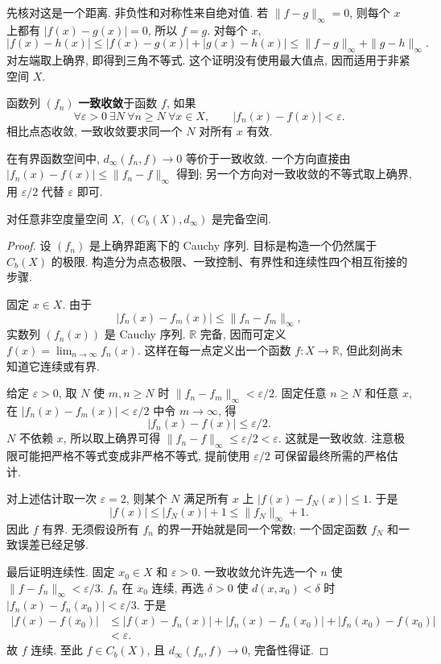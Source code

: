 先核对这是一个距离. 非负性和对称性来自绝对值. 若 $\|f-g\|_\infty=0$, 则每个 $x$ 上都有 $|f(x)-g(x)|=0$, 所以 $f=g$. 对每个 $x$,
\[
|f(x)-h(x)|\leq |f(x)-g(x)|+|g(x)-h(x)|
\leq\|f-g\|_\infty+\|g-h\|_\infty.
\]
对左端取上确界, 即得到三角不等式. 这个证明没有使用最大值点, 因而适用于非紧空间 $X$.

\begin{definition}
函数列 $(f_n)$ \textbf{一致收敛}于函数 $f$, 如果
\[
\forall\varepsilon>0\ \exists N\ \forall n\geq N\ \forall x\in X,
\qquad |f_n(x)-f(x)|<\varepsilon.
\]
相比点态收敛, 一致收敛要求同一个 $N$ 对所有 $x$ 有效.
\end{definition}

在有界函数空间中, $d_\infty(f_n,f)\to0$ 等价于一致收敛. 一个方向直接由
$|f_n(x)-f(x)|\leq\|f_n-f\|_\infty$ 得到; 另一个方向对一致收敛的不等式取上确界, 用 $\varepsilon/2$ 代替 $\varepsilon$ 即可.

\begin{theorem}\label{thm:cb-complete}
对任意非空度量空间 $X$, $(C_b(X),d_\infty)$ 是完备空间.
\end{theorem}
\begin{proof}
设 $(f_n)$ 是上确界距离下的 Cauchy 序列. 目标是构造一个仍然属于 $C_b(X)$ 的极限. 构造分为点态极限、一致控制、有界性和连续性四个相互衔接的步骤.

固定 $x\in X$. 由于
\[
|f_n(x)-f_m(x)|\leq\|f_n-f_m\|_\infty,
\]
实数列 $(f_n(x))$ 是 Cauchy 序列. $\mathbb R$ 完备, 因而可定义
$f(x)=\lim_{n\to\infty}f_n(x)$. 这样在每一点定义出一个函数 $f:X\to\mathbb R$, 但此刻尚未知道它连续或有界.

给定 $\varepsilon>0$, 取 $N$ 使 $m,n\geq N$ 时
$\|f_n-f_m\|_\infty<\varepsilon/2$. 固定任意 $n\geq N$ 和任意 $x$, 在
$|f_n(x)-f_m(x)|<\varepsilon/2$ 中令 $m\to\infty$, 得
\[
|f_n(x)-f(x)|\leq\varepsilon/2.
\]
$N$ 不依赖 $x$, 所以取上确界可得
$\|f_n-f\|_\infty\leq\varepsilon/2<\varepsilon$. 这就是一致收敛. 注意极限可能把严格不等式变成非严格不等式, 提前使用 $\varepsilon/2$ 可保留最终所需的严格估计.

对上述估计取一次 $\varepsilon=2$, 则某个 $N$ 满足所有 $x$ 上
$|f(x)-f_N(x)|\leq1$. 于是
\[
|f(x)|\leq |f_N(x)|+1\leq\|f_N\|_\infty+1.
\]
因此 $f$ 有界. 无须假设所有 $f_n$ 的界一开始就是同一个常数; 一个固定函数 $f_N$ 和一致误差已经足够.

最后证明连续性. 固定 $x_0\in X$ 和 $\varepsilon>0$. 一致收敛允许先选一个 $n$ 使
$\|f-f_n\|_\infty<\varepsilon/3$. $f_n$ 在 $x_0$ 连续, 再选 $\delta>0$ 使
$d(x,x_0)<\delta$ 时 $|f_n(x)-f_n(x_0)|<\varepsilon/3$. 于是
\begin{align*}
|f(x)-f(x_0)|
&\leq |f(x)-f_n(x)|+|f_n(x)-f_n(x_0)|
     +|f_n(x_0)-f(x_0)|\\
&<\varepsilon.
\end{align*}
故 $f$ 连续. 至此 $f\in C_b(X)$, 且 $d_\infty(f_n,f)\to0$, 完备性得证.
\end{proof}

